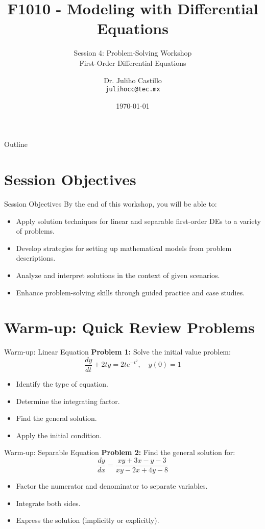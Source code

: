 \documentclass[10pt,aspectratio=169]{beamer}
\title{F1010 - Modeling with Differential Equations}
\subtitle{Session 4: Problem-Solving Workshop \\ First-Order Differential Equations}
\author{Dr. Juliho Castillo \\ \texttt{julihocc@tec.mx}}
\institute{Tec de Monterrey}
\date{\today}
\newcommand{\concept}[1]{\textbf{#1}}
\newcommand{\formula}[1]{\textit{#1}}
\begin{document}
\maketitle

\begin{frame}{Outline}
    \tableofcontents
\end{frame}

\section{Session Objectives}
\begin{frame}{Session Objectives}
    By the end of this workshop, you will be able to:
    \begin{itemize}
        \item Apply solution techniques for linear and separable first-order DEs to a variety of problems.
        \item Develop strategies for setting up mathematical models from problem descriptions.
        \item Analyze and interpret solutions in the context of given scenarios.
        \item Enhance problem-solving skills through guided practice and case studies.
    \end{itemize}
\end{frame}

\section{Warm-up: Quick Review Problems}
\begin{frame}{Warm-up: Linear Equation}
    \concept{Problem 1:} Solve the initial value problem:
    \formula{\[ \frac{dy}{dt} + 2ty = 2te^{-t^2}, \quad y(0) = 1 \]}
    \begin{itemize}
        \item Identify the type of equation.
        \item Determine the integrating factor.
        \item Find the general solution.
        \item Apply the initial condition.
    \end{itemize}
\end{frame}

\begin{frame}{Warm-up: Separable Equation}
    \concept{Problem 2:} Find the general solution for:
    \formula{\[ \frac{dy}{dx} = \frac{xy+3x-y-3}{xy-2x+4y-8} \]}
    \begin{itemize}
        \item Factor the numerator and denominator to separate variables.
        \item Integrate both sides.
        \item Express the solution (implicitly or explicitly).
    \end{itemize}
\end{frame}
\end{document}
